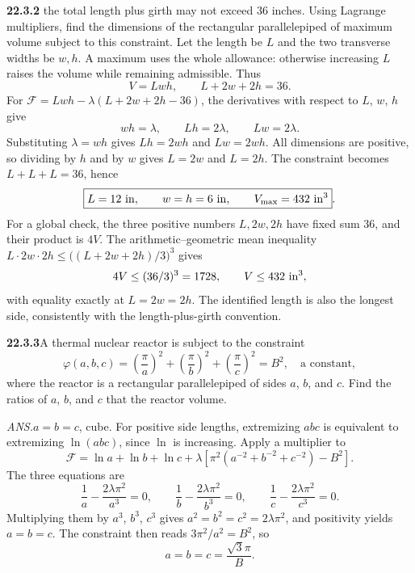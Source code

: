 \par\bigskip
\noindent\textbf{22.3.2}\quad {}
the total length plus girth may not exceed 36 inches. Using Lagrange multipliers, find the dimensions of the
rectangular parallelepiped of maximum volume subject to this
constraint.
\solution
{}
Let the length be
$L$ and the two transverse widths be $w,h$. A maximum uses the
whole allowance: otherwise increasing $L$ raises the volume while
remaining admissible. Thus
\[
V=Lwh,\qquad L+2w+2h=36.
\]
For $\mathcal F=Lwh-\lambda(L+2w+2h-36)$, the derivatives with
respect to $L$, $w$, $h$ give
\[
wh=\lambda,\qquad Lh=2\lambda,\qquad Lw=2\lambda.
\]
Substituting $\lambda=wh$ gives $Lh=2wh$ and $Lw=2wh$. All dimensions
are positive, so dividing by $h$ and by $w$ gives
$L=2w$ and $L=2h$. The constraint becomes $L+L+L=36$, hence
\[
\boxed{L=12\ {\rm in},\qquad w=h=6\ {\rm in},\qquad
V_{\max}=432\ {\rm in}^3}.
\]
For a global check, the three positive numbers $L,2w,2h$ have
fixed sum 36, and their product is $4V$. The arithmetic--geometric
mean inequality $L\cdot2w\cdot2h\le\bigl((L+2w+2h)/3\bigr)^3$ gives
\[
4V\le(36/3)^3=1728,\qquad V\le432\ {\rm in}^3,
\]
with equality exactly at $L=2w=2h$. The identified length is also
the longest side, consistently with the length-plus-girth convention.


\par\bigskip
\noindent\textbf{22.3.3}\quad A thermal nuclear reactor is subject
to the constraint
\[
\varphi(a,b,c)=\left(\frac{\pi}{a}\right)^{2}
+\left(\frac{\pi}{b}\right)^{2}+\left(\frac{\pi}{c}\right)^{2}
=B^{2},\quad\text{a constant},
\]
where the reactor is a rectangular parallelepiped of sides $a$,
$b$, and $c$.  Find the ratios of $a$, $b$, and $c$ that 
the reactor volume. 
\par\nobreak\hfill\emph{ANS.}\enspace$a=b=c$, cube.
\solution
For positive side lengths, extremizing $abc$ is equivalent to
extremizing $\ln(abc)$, since $\ln$ is increasing. Apply a multiplier to
\[
\mathcal F=\ln a+\ln b+\ln c+
\lambda\left[\pi^2(a^{-2}+b^{-2}+c^{-2})-B^2\right].
\]
The three equations are
\[
\frac1a-\frac{2\lambda\pi^2}{a^3}=0,\qquad
\frac1b-\frac{2\lambda\pi^2}{b^3}=0,\qquad
\frac1c-\frac{2\lambda\pi^2}{c^3}=0.
\]
Multiplying them by $a^3$, $b^3$, $c^3$ gives
$a^2=b^2=c^2=2\lambda\pi^2$, and positivity yields
$a=b=c$. The constraint then reads $3\pi^2/a^2=B^2$, so
\[
a=b=c=\frac{\sqrt3\pi}{B}.
\]

